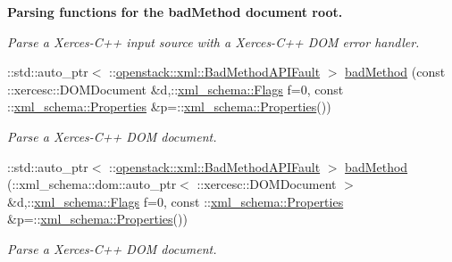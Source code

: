 \begin{Indent}{\bf Parsing functions for the badMethod document root.}
\begin{DoxyCompactItemize}
\begin{DoxyCompactList}\small\item\em Parse a Xerces-\/C++ input source with a Xerces-\/C++ DOM error handler. \item\end{DoxyCompactList}\item 
::std::auto\_\-ptr$<$ ::\hyperlink{classopenstack_1_1xml_1_1BadMethodAPIFault}{openstack::xml::BadMethodAPIFault} $>$ \hyperlink{namespaceopenstack_1_1xml_ac14bb0c9c0fd47983567800c16b1b023}{badMethod} (const ::xercesc::DOMDocument \&d,::\hyperlink{namespacexml__schema_affb4c227cbd9aa7453dd1dc5a1401943}{xml\_\-schema::Flags} f=0, const ::\hyperlink{namespacexml__schema_ad27ce19a7ee1d3b1064092648898f64c}{xml\_\-schema::Properties} \&p=::\hyperlink{namespacexml__schema_ad27ce19a7ee1d3b1064092648898f64c}{xml\_\-schema::Properties}())
\begin{DoxyCompactList}\small\item\em Parse a Xerces-\/C++ DOM document. \item\end{DoxyCompactList}\item 
::std::auto\_\-ptr$<$ ::\hyperlink{classopenstack_1_1xml_1_1BadMethodAPIFault}{openstack::xml::BadMethodAPIFault} $>$ \hyperlink{namespaceopenstack_1_1xml_a15d1dd9f9f326587252b6c5df391736a}{badMethod} (::xml\_\-schema::dom::auto\_\-ptr$<$ ::xercesc::DOMDocument $>$ \&d,::\hyperlink{namespacexml__schema_affb4c227cbd9aa7453dd1dc5a1401943}{xml\_\-schema::Flags} f=0, const ::\hyperlink{namespacexml__schema_ad27ce19a7ee1d3b1064092648898f64c}{xml\_\-schema::Properties} \&p=::\hyperlink{namespacexml__schema_ad27ce19a7ee1d3b1064092648898f64c}{xml\_\-schema::Properties}())
\begin{DoxyCompactList}\small\item\em Parse a Xerces-\/C++ DOM document. \item\end{DoxyCompactList}\end{DoxyCompactItemize}
\end{Indent}
